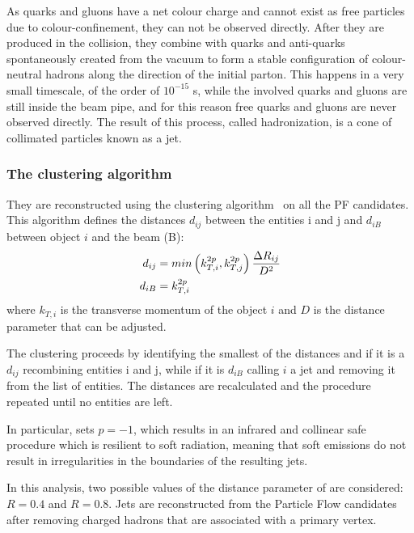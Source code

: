 As quarks and gluons have a net colour charge and cannot exist as free particles due to colour-confinement, they can not be observed directly.
After they are produced in the collision, they combine with quarks and anti-quarks spontaneously created from the vacuum
to form a stable configuration of colour-neutral hadrons along the direction of the initial parton.
This happens in a very small timescale, of the order of $10^{-15}$ s, while the involved quarks and gluons are still inside the beam pipe,
and for this reason free quarks and gluons are never observed directly.
The result of this process, called hadronization, is a cone of collimated particles known as a jet.

\subsubsection[The anti-kt clustering algorithm]{The \antikt clustering algorithm} %

They are reconstructed using the \antikt clustering algorithm~\cite{Cacciari:2008gp} on all the PF candidates.
This algorithm defines the distances $d_{ij}$ between the entities i and j and $d_{iB}$ between object $i$ and the beam (B):
\begin{equation}
\begin{split}
d_{ij} &= min \left( k^{2p}_{T,i}, k^{2p}_{T,j} \right) \frac{\Delta R_{ij}}{D^2}\\
d_{iB} &= k^{2p}_{T,i}
\end{split}
\end{equation}
where $k_{T, i}$ is the transverse momentum of the object $i$ and $D$ is the distance parameter that can be adjusted.

The clustering proceeds by identifying the smallest of the distances and if it is a $d_{ij}$ recombining entities i and j,
while if it is $d_{iB}$ calling $i$ a jet and removing it from the list of entities.
The distances are recalculated and the procedure repeated until no entities are left.

In particular, \antikt sets $p = -1$, which results in an infrared and collinear safe procedure which is resilient to soft radiation,
meaning that soft emissions do not result in irregularities in the boundaries of the resulting jets.

In this analysis, two possible values of the distance parameter of \antikt are considered: $R = 0.4$ and $R = 0.8$.
Jets are reconstructed from the Particle Flow candidates after removing charged hadrons that are associated with a \pileup{} primary vertex.
